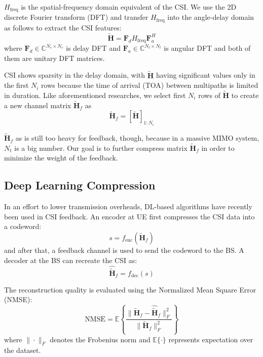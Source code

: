 \documentclass[lettersize,journal]{IEEEtran}
\begin{document}
$H_{\text{freq}}$ is the spatial-frequency domain equivalent of the CSI. We use the 2D discrete Fourier transform (DFT) and transfer $H_{\text{freq}}$ into the angle-delay domain as follows to extract the CSI features:
\begin{equation}
	\tilde{\mathbf{H}} = \mathbf{F}_d H_{\text{freq}} \mathbf{F}_a^H
	\label{eq:2d_dft_transform}
\end{equation}
where $\mathbf{F}_d \in \mathbb{C}^{N_{c}\times N_{c}}$ is delay DFT and $\mathbf{F}_a \in \mathbb{C}^{N_{t}\times N_{t}}$ is angular DFT and both of them are unitary DFT matrices.

CSI shows sparsity in the delay domain, with $\tilde{\mathbf{H}}$ having significant values only in the first $N_{i}$ rows because the time of arrival (TOA) between multipaths is limited in duration. Like aforementioned researches, we select first $N_{i}$ rows of $\tilde{\mathbf{H}}$ to create a new channel matrix $\tilde{\mathbf{H}}_f$ as
\[
\tilde{\mathbf{H}}_f = \left[ \tilde{\mathbf{H}} \right]_{1:N_{i}} 
\]

$\tilde{\mathbf{H}}_f$ as is still too heavy for feedback, though, because in a massive MIMO system, $N_{t}$ is a big number. Our goal is to further compress matrix $\tilde{\mathbf{H}}_f$ in order to minimize the weight of the feedback.

\subsection{Deep Learning Compression}
In an effort to lower transmission overheads, DL-based algorithms have recently been used in CSI feedback. An encoder at UE first compresses the CSI data into a codeword:
\begin{equation}
	s = f_{\text{enc}}(\tilde{\mathbf{H}}_f)
	\label{eq:encoder_function}
\end{equation}
and after that, a feedback channel is used to send the codeword to the BS. A decoder at the BS can recreate the CSI as:
\begin{equation}
	\hat{\tilde{\mathbf{H}}}_f = f_{\text{dec}}(s)
	\label{eq:decoder_function}
\end{equation}

The reconstruction quality is evaluated using the Normalized Mean Square Error (NMSE):
\begin{equation}
	\text{NMSE} = \mathbb{E}\left\{\frac{\|\tilde{\mathbf{H}}_f - \hat{\tilde{\mathbf{H}}}_f\|_F^2}{\|\tilde{\mathbf{H}}_f\|_F^2}\right\}
	\label{eq:nmse_definition}
\end{equation}
where $\|\cdot\|_F$ denotes the Frobenius norm and $\mathbb{E}\{\cdot\}$ represents expectation over the dataset.
\end{document}
